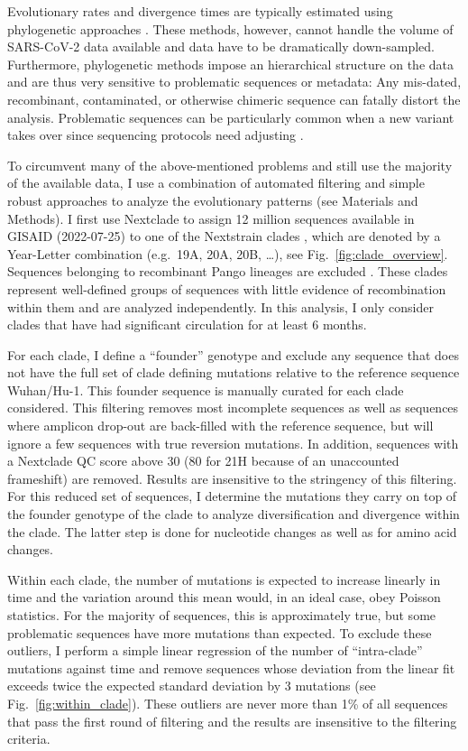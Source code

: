 \documentclass[aps,rmp, twocolumn]{revtex4}
\begin{document}
Evolutionary rates and divergence times are typically estimated using phylogenetic approaches \citep{drummond_relaxed_2006}.
These methods, however, cannot handle the volume of SARS-CoV-2 data available and data have to be dramatically down-sampled.
Furthermore, phylogenetic methods impose an hierarchical structure on the data and are thus very sensitive to problematic sequences or metadata: Any mis-dated, recombinant, contaminated, or otherwise chimeric sequence can fatally distort the analysis.
Problematic sequences can be particularly common when a new variant takes over since sequencing protocols need adjusting \citep{deMaio_issues_2020}.

To circumvent many of the above-mentioned problems and still use the majority of the available data, I use a combination of automated filtering and simple robust approaches to analyze the evolutionary patterns (see Materials and Methods).
I first use Nextclade \citep{aksamentov_nextclade_2021} to assign 12 million sequences available in GISAID (2022-07-25) \citep{shu_gisaid_2017} to one of the Nextstrain clades \citep{hadfield_nextstrain_2018,roemer_sars-cov-2_2022}, which are denoted by a Year-Letter combination (e.g.~19A, 20A, 20B, \ldots), see Fig.~\ref{fig:clade_overview}.
Sequences belonging to recombinant Pango lineages are excluded \citep{rambaut_dynamic_2020}.
These clades represent well-defined groups of sequences with little evidence of recombination within them and are analyzed independently.
In this analysis, I only consider clades that have had significant circulation for at least 6 months.

For each clade, I define a ``founder'' genotype and exclude any sequence that does not have the full set of clade defining mutations relative to the reference sequence Wuhan/Hu-1.
This founder sequence is manually curated for each clade considered.
This filtering removes most incomplete sequences as well as sequences where amplicon drop-out are back-filled with the reference sequence, but will ignore a few sequences with true reversion mutations.
In addition, sequences with a Nextclade QC score above 30 (80 for 21H because of an unaccounted frameshift) are removed.
Results are insensitive to the stringency of this filtering.
For this reduced set of sequences, I determine the mutations they carry on top of the founder genotype of the clade to analyze diversification and divergence within the clade.
The latter step is done for nucleotide changes as well as for amino acid changes.

Within each clade, the number of mutations is expected to increase linearly in time and the variation around this mean would, in an ideal case, obey Poisson statistics.
For the majority of sequences, this is approximately true, but some problematic sequences have more mutations than expected.
To exclude these outliers, I perform a simple linear regression of the number of ``intra-clade'' mutations against time and remove sequences whose deviation from the linear fit exceeds twice the expected standard deviation by 3 mutations (see Fig.~\ref{fig:within_clade}). These outliers are never more than 1\% of all sequences that pass the first round of filtering and the results are insensitive to the filtering criteria.
\end{document}
